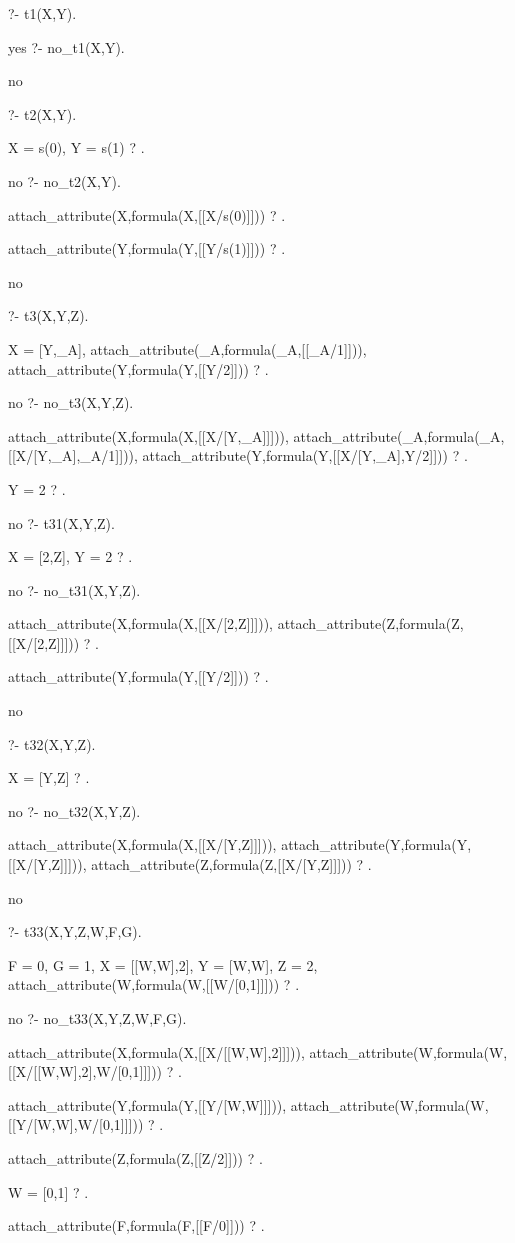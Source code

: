 ?- t1(X,Y).

yes
?- no_t1(X,Y).

no

?- t2(X,Y).

X = s(0),
Y = s(1) ? .

no
?- no_t2(X,Y).

attach_attribute(X,formula(X,[[X/s(0)]])) ? .

attach_attribute(Y,formula(Y,[[Y/s(1)]])) ? .

no

?- t3(X,Y,Z).

X = [Y,_A],
attach_attribute(_A,formula(_A,[[_A/1]])),
attach_attribute(Y,formula(Y,[[Y/2]])) ? .

no
?- no_t3(X,Y,Z).

attach_attribute(X,formula(X,[[X/[Y,_A]]])),
attach_attribute(_A,formula(_A,[[X/[Y,_A],_A/1]])),
attach_attribute(Y,formula(Y,[[X/[Y,_A],Y/2]])) ? .

Y = 2 ? .

no
?- t31(X,Y,Z).

X = [2,Z],
Y = 2 ? .

no
?- no_t31(X,Y,Z).

attach_attribute(X,formula(X,[[X/[2,Z]]])),
attach_attribute(Z,formula(Z,[[X/[2,Z]]])) ? .

attach_attribute(Y,formula(Y,[[Y/2]])) ? .

no

?- t32(X,Y,Z).

X = [Y,Z] ? .

no
?- no_t32(X,Y,Z).

attach_attribute(X,formula(X,[[X/[Y,Z]]])),
attach_attribute(Y,formula(Y,[[X/[Y,Z]]])),
attach_attribute(Z,formula(Z,[[X/[Y,Z]]])) ? .

no

?- t33(X,Y,Z,W,F,G).

F = 0,
G = 1,
X = [[W,W],2],
Y = [W,W],
Z = 2,
attach_attribute(W,formula(W,[[W/[0,1]]])) ? .

no
?- no_t33(X,Y,Z,W,F,G).

attach_attribute(X,formula(X,[[X/[[W,W],2]]])),
attach_attribute(W,formula(W,[[X/[[W,W],2],W/[0,1]]])) ? .

attach_attribute(Y,formula(Y,[[Y/[W,W]]])),
attach_attribute(W,formula(W,[[Y/[W,W],W/[0,1]]])) ? .

attach_attribute(Z,formula(Z,[[Z/2]])) ? .

W = [0,1] ? .

attach_attribute(F,formula(F,[[F/0]])) ? .

